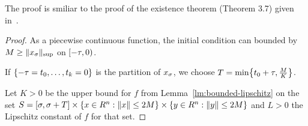     The proof is smiliar to the proof of the existence theorem (Theorem 3.7) given in~\cite{Smith10IntroDDE}.
    \begin{proof}
        As a piecewise continuous function, the initial condition can bounded by $M\geq \supnorm{x_\tzero}$ on $\delayinterval[-\tau]$.
        
        If $\set{\range{-\tau=t_0}{t_k=0}}$ is the partition of $x_{\tzero}$, we choose $T=\min\set{t_0+\tau,\frac{M}{K}}$.
        
        Let $K>0$ be the upper bound for $f$ from Lemma~\ref{lm:bounded-lipschitz} on the set $S=[\tzero,\tzero+T] \times \{x\in R^n: \nnorm{x}\leq 2M\}\times \{y\in R^n: \nnorm{y}\leq 2M\}$ and $L>0$ the Lipschitz constant of $f$ for that set.


\end{proof}
